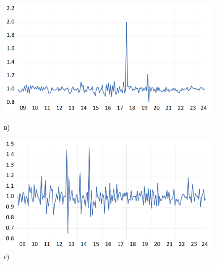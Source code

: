 \documentclass[a4paper, 14pt]{extreport}
\numberwithin{equation}{subsection}
\numberwithin{equation}{section}
\begin{document}
\begin{figure}
		\begin{minipage}{0.5\textwidth}
			\centering
		\includegraphics[scale=0.25]{images/img11}
			\caption*{в)}
		\end{minipage}%
		\hfill %
		\begin{minipage}{0.5\textwidth}
			\centering
		\includegraphics[scale=0.25]{images/img12}
			\caption*{г)}
		\end{minipage}%
		

\end{figure}
\end{document}
